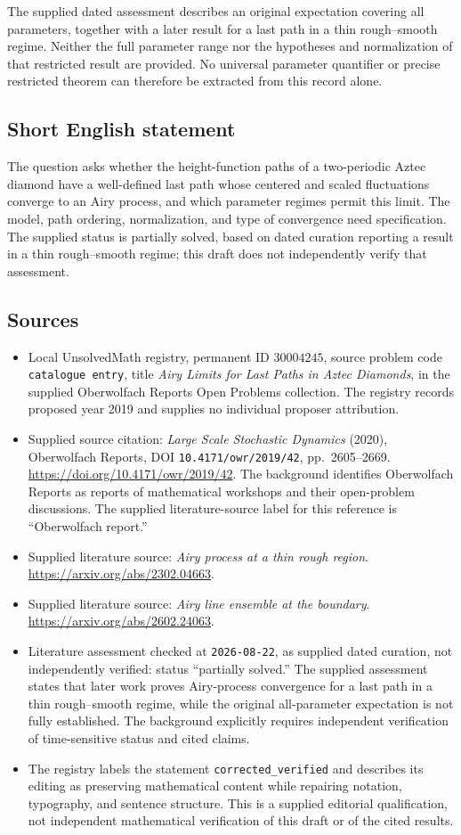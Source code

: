 \documentclass[11pt]{article}
\begin{document}
The supplied dated assessment describes an original expectation covering all parameters, together with a later result for a last path in a thin rough--smooth regime. Neither the full parameter range nor the hypotheses and normalization of that restricted result are provided. No universal parameter quantifier or precise restricted theorem can therefore be extracted from this record alone.
\subsection{Short English statement}
The question asks whether the height-function paths of a two-periodic Aztec diamond have a well-defined last path whose centered and scaled fluctuations converge to an Airy process, and which parameter regimes permit this limit. The model, path ordering, normalization, and type of convergence need specification. The supplied status is partially solved, based on dated curation reporting a result in a thin rough--smooth regime; this draft does not independently verify that assessment.
\subsection{Sources}
\begin{itemize}
\item Local UnsolvedMath registry, permanent ID \(30004245\), source problem code \texttt{catalogue entry}, title \emph{Airy Limits for Last Paths in Aztec Diamonds}, in the supplied Oberwolfach Reports Open Problems collection. The registry records proposed year 2019 and supplies no individual proposer attribution.
\item Supplied source citation: \emph{Large Scale Stochastic Dynamics} (2020), Oberwolfach Reports, DOI \texttt{10.4171/owr/2019/42}, pp.\ 2605--2669. \url{https://doi.org/10.4171/owr/2019/42}. The background identifies Oberwolfach Reports as reports of mathematical workshops and their open-problem discussions. The supplied literature-source label for this reference is ``Oberwolfach report.''
\item Supplied literature source: \emph{Airy process at a thin rough region}. \url{https://arxiv.org/abs/2302.04663}.
\item Supplied literature source: \emph{Airy line ensemble at the boundary}. \url{https://arxiv.org/abs/2602.24063}.
\item Literature assessment checked at \texttt{2026-08-22}, as supplied dated curation, not independently verified: status ``partially solved.'' The supplied assessment states that later work proves Airy-process convergence for a last path in a thin rough--smooth regime, while the original all-parameter expectation is not fully established. The background explicitly requires independent verification of time-sensitive status and cited claims.
\item The registry labels the statement \texttt{corrected\_verified} and describes its editing as preserving mathematical content while repairing notation, typography, and sentence structure. This is a supplied editorial qualification, not independent mathematical verification of this draft or of the cited results.
\end{itemize}
\end{document}
